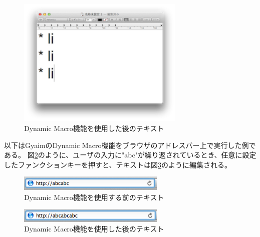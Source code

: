 \begin{figure}[H]
\centerline{\includegraphics[width=80mm,bb=0 0 360 190]{figures/dynamic2.png}}
\caption{Dynamic Macro機能を使用した後のテキスト}
\label{dynamic2}
\end{figure}


以下はGyaimのDynamic Macro機能をブラウザのアドレスバー上で実行した例である。
図\ref{dynamic3}のように、ユーザの入力に"abc"が繰り返されているとき、任意に設定したファンクションキーを押すと、テキストは図\ref{dynamic4}のように編集される。

\begin{figure}[H]
\centerline{\includegraphics[width=70mm,bb=0 0 360 50]{figures/dynamic3.png}}
\caption{Dynamic Macro機能を使用する前のテキスト}
\label{dynamic3}
\end{figure}

\begin{figure}[H]
\centerline{\includegraphics[width=70mm,bb=0 0 360 50]{figures/dynamic4.png}}
\caption{Dynamic Macro機能を使用した後のテキスト}
\label{dynamic4}
\end{figure}



